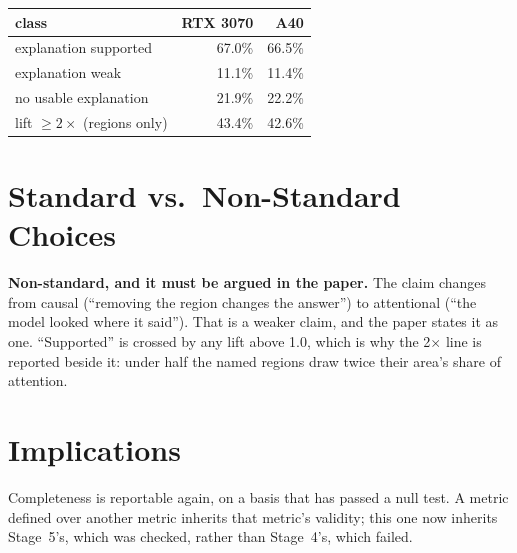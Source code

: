 \begin{center}
\begin{tabular}{p{5.8cm}rr}
\toprule
\textbf{class} & \textbf{RTX 3070} & \textbf{A40} \\
\midrule
explanation supported       & 67.0\% & 66.5\% \\
explanation weak            & 11.1\% & 11.4\% \\
no usable explanation       & 21.9\% & 22.2\% \\
lift $\geq 2\times$ (regions only) & 43.4\% & 42.6\% \\
\bottomrule
\end{tabular}
\label{tab:s23}
\end{center}

\section{Standard vs.\ Non-Standard Choices}

\textbf{Non-standard, and it must be argued in the paper.} The claim changes from causal (``removing the
region changes the answer'') to attentional (``the model looked where it said''). That is a weaker claim,
and the paper states it as one. ``Supported'' is crossed by any lift above 1.0, which is why the 2$\times$
line is reported beside it: under half the named regions draw twice their area's share of attention.

\section{Implications}

Completeness is reportable again, on a basis that has passed a null test. A metric defined over another
metric inherits that metric's validity; this one now inherits Stage~5's, which was checked, rather than
Stage~4's, which failed.
